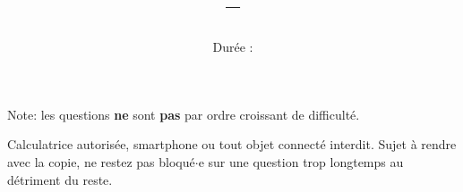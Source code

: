 \documentclass[a4paper,12pt]{scrartcl}
\date{}
\title{\typedevoir{} -- \classe{}\writecorrword{}}
\author{Durée : \duree{}}
\begin{document}
 

\maketitle 

Note: les questions \textbf{ne} sont \textbf{pas} par ordre croissant de difficulté. 

Calculatrice autorisée, smartphone ou tout objet connecté interdit. Sujet à rendre avec la copie, ne restez pas bloqué$\cdot$e sur une question trop longtemps au détriment du reste. 



 


 
\end{document}
